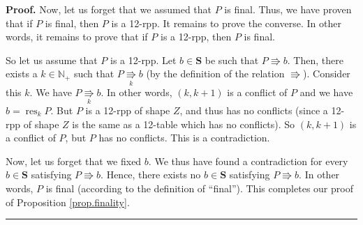\documentclass[numbers=enddot,12pt,final,onecolumn,notitlepage]{scrartcl}%
\theoremstyle{definition}
\newenvironment{proof}[1][Proof]{\noindent\textbf{#1.} }{\ \rule{0.5em}{0.5em}}
\newenvironment{vershort}{}{}
\begin{document}
\begin{vershort}
\begin{proof}
Now, let us forget that we assumed that $P$ is final. Thus, we have proven
that if $P$ is final, then $P$ is a 12-rpp. It remains to prove the converse.
In other words, it remains to prove that if $P$ is a 12-rpp, then $P$ is final.

So let us assume that $P$ is a 12-rpp. Let $b\in\mathbf{S}$ be such that
$P\Rrightarrow b$. Then, there exists a $k\in\mathbb{N}_{+}$ such that
$P\underset{k}{\Rrightarrow}b$ (by the definition of the relation
$\Rrightarrow$). Consider this $k$. We have $P\underset{k}{\Rrightarrow}b$. In
other words, $\left(  k,k+1\right)  $ is a conflict of $P$ and we have
$b=\operatorname*{res}\nolimits_{k}P$. But $P$ is a 12-rpp of shape $Z$, and
thus has no conflicts (since a 12-rpp of shape $Z$ is the same as a 12-table
which has no conflicts). So $\left(  k,k+1\right)  $ is a conflict of $P$, but
$P$ has no conflicts. This is a contradiction.

Now, let us forget that we fixed $b$. We thus have found a contradiction for
every $b\in\mathbf{S}$ satisfying $P\Rrightarrow b$. Hence, there exists no
$b\in\mathbf{S}$ satisfying $P\Rrightarrow b$. In other words, $P$ is final
(according to the definition of \textquotedblleft final\textquotedblright).
This completes our proof of Proposition \ref{prop.finality}.
\end{proof}
\end{vershort}
\end{document}
